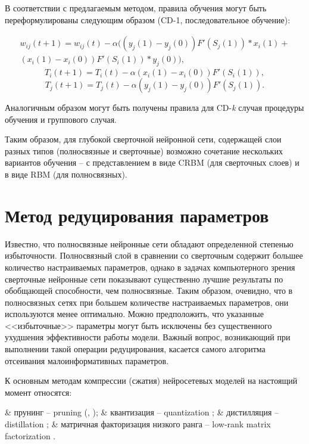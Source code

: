 В соответствии с предлагаемым методом, правила обучения могут быть переформулированы следующим образом (CD-1, последовательное обучение):

\begin{multline*}
    w_{ij}(t+1)=w_{ij}(t)-\alpha((y_j(1)-y_j(0))F'(S_j(1)) * x_i(1)+\\(x_i(1)-x_i(0))F'(S_i(1)) * y_j(0)),    
\end{multline*}
\begin{equation*}
    T_i(t+1)=T_i(t)-\alpha(x_i(1)-x_i(0))F'(S_i(1)),
\end{equation*}
\begin{equation*}
    T_j(t+1)=T_j(t)-\alpha(y_j(1)-y_j(0))F'(S_j(1)).  
\end{equation*}

Аналогичным образом могут быть получены правила для CD-\textit{k} случая процедуры обучения и группового случая.

Таким образом, для глубокой сверточной нейронной сети, содержащей слои разных типов (полносвязные и сверточные) возможно сочетание нескольких вариантов обучения -- с представлением в виде CRBM (для сверточных слоев) и в виде RBM (для полносвязных).  

\section{Метод редуцирования параметров}
Известно, что полносвязные нейронные сети обладают определенной степенью избыточности. Полносвязный слой в сравнении со сверточным содержит большее количество настраиваемых параметров, однако в задачах компьютерного зрения сверточные нейронные сети показывают существенно лучшие результаты по обобщающей способности, чем полносвязные. Таким образом, очевидно, что в полносвязных сетях при большем количестве настраиваемых параметров, они используются менее оптимально. Можно предположить, что указанные <<избыточные>> параметры могут быть исключены без существенного ухудшения эффективности работы модели. Важный вопрос, возникающий при выполнении такой операции редуцирования, касается самого алгоритма отсеивания малоинформативных параметров.

К основным методам компрессии (сжатия) нейросетевых моделей на настоящий момент относятся:
\begin{easylistNum}
	& прунинг -- pruning (\cite{wang2019pruning}, \cite{xu2020});
	& квантизация -- quantization \cite{hubara2016quantized};
	& дистилляция -- distillation \cite{Hinton2015DistillingTK};
	& матричная факторизация низкого ранга -- low-rank matrix factorization \cite{Sainath2013}.
\end{easylistNum}

